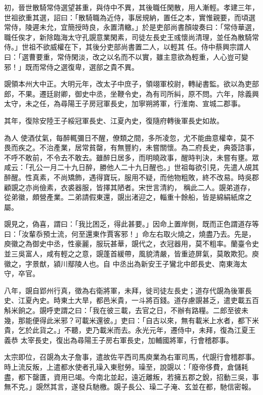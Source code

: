 \begin{pinyinscope}
 初，晉世散騎常侍選望甚重，與侍中不異，其後職任閑散，用人漸輕。孝建三年，世祖欲重其選，詔曰：「散騎職為近侍，事居規納，置任之本，實惟親要，而頃選常侍，陵遲未允，宜簡授時良，永置清轍。」於是吏部尚書顏竣奏曰：「常侍華選，職任俟才，新除臨海太守孔覬意業閑素，司徒左長史王彧懷尚清理，並任為散騎常侍。」世祖不欲威權在下，其後分吏部尚書置二人，以輕其
 任。侍中蔡興宗謂人曰：「選曹要重，常侍閑淡，改之以名而不以實，雖主意欲為輕重，人心豈可變邪！」既而常侍之選復卑，選部之貴不異。



 覬領本州大中正。大明元年，改太子中庶子，領翊軍校尉，轉祕書監。欲以為吏部郎，不果。遷廷尉卿，御史中丞，坐鞭令史，為有司所糾，原不問。六年，除義興太守，未之任，為尋陽王子房冠軍長史，加寧朔將軍，行淮南、宣城二郡事。



 其年，復除安陸王子綏冠軍長史、江夏內史，復隨府轉後軍長史如故。



 為人
 使酒仗氣，每醉輒彌日不醒，僚類之間，多所凌忽，尤不能曲意權幸，莫不畏而疾之。不治產業，居常貧罄，有無豐約，未嘗關懷。為二府長史，典簽諮事，不呼不敢前，不令去不敢去。雖醉日居多，而明曉政事，醒時判決，未嘗有壅。眾咸云：「孔公一月二十九日醉，勝他人二十九日醒也。」世祖每欲引見，先遣人覘其醉醒。性真素，不尚矯飾，遇得寶玩，服用不疑，而他物粗敗，終不改易。時吳郡顧覬之亦尚儉素，衣裘器服，皆擇其陋者。宋世言清約，
 稱此二人。覬弟道存，從弟徽，頗營產業。二弟請假東還，覬出渚迎之，輜重十餘船，皆是綿絹紙席之屬。



 覬見之，偽喜，謂曰：「我比困乏，得此甚要。」因命上置岸側，既而正色謂道存等曰：「汝輩忝預士流，何至還東作賈客邪！」命左右取火燒之，燒盡乃去。先是，庾徽之為御史中丞，性豪麗，服玩甚華，覬代之，衣冠器用，莫不粗率。蘭臺令史並三吳富人，咸有輕之之意，覬蓬首緩帶，風貌清嚴，皆重迹屏氣，莫敢欺犯。庾徽之，字景猷，潁川鄢陵人也。自
 中丞出為新安王子鸞北中郎長史、南東海太守，卒官。



 八年，覬自郢州行真，徵為右衛將軍，未拜，徙司徒左長史；道存代覬為後軍長史、江夏內史。時東土大旱，都邑米貴，一斗將百錢。道存慮覬甚乏，遣吏載五百斛米餉之。覬呼吏謂之曰：「我在彼三載，去官之日，不辦有路糧。二郎至彼未幾，那能便得此米邪？可載米還彼。」吏曰：「自古以來，無有載米上水者，都下米貴，乞於此貨之。」不聽，吏乃載米而去。永光元年，遷侍中，未拜，復為江夏王義恭
 太宰長史，復出為尋陽王子房右軍長史，加輔國將軍，行會稽郡事。



 太宗即位，召覬為太子詹事，遣故佐平西司馬庾業為右軍司馬，代覬行會稽郡事。時上流反叛，上遣都水使者孔璪入東慰勞。璪至，說覬以：「廢帝侈費，倉儲耗盡，都下罄匱，資用已竭。今南北並起，遠近離叛，若擁五郡之銳，招動三吳，事無不克。」覬然其言，遂發兵馳檄。覬子長公、璪二子淹、玄並在都，馳信密報。




\end{pinyinscope}
